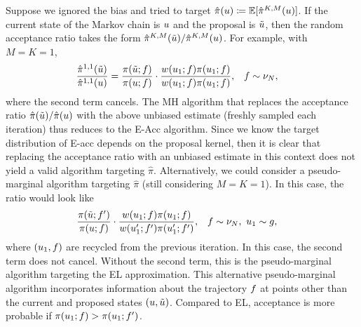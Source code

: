 \documentclass[12pt]{article}
\begin{document}
Suppose we ignored the bias and tried to target $\hat{\pi}(u) \coloneqq \mathbb{E}[\hat{\pi}^{K,M}(u)]$. If the current state of the Markov chain is $u$
and the proposal is $\tilde{u}$, then the random acceptance ratio takes the form $\hat{\pi}^{K,M}(\tilde{u})/\hat{\pi}^{K,M}(u)$. 
For example, with $M = K = 1$,
\begin{align}
&\frac{\hat{\pi}^{1,1}(\tilde{u})}{\hat{\pi}^{1,1}(u)}
= \frac{\pi(\tilde{u}; f)}{\pi(u; f)} \cdot
\frac{w(u_1; f)\pi(u_1; f)}{w(u_1; f)\pi(u_1; f)}, &&f \sim \nu_{N},
\end{align}
where the second term cancels. The MH algorithm that replaces the acceptance ratio $\hat{\pi}(\tilde{u})/\hat{\pi}(u)$ with the 
above unbiased estimate (freshly sampled each iteration) thus reduces to the E-Acc algorithm. Since we know the target distribution 
of E-acc depends on the proposal kernel, then it is clear that replacing the acceptance ratio with an unbiased estimate in this context does
not yield a valid algorithm targeting $\hat{\pi}$. Alternatively, we could consider a pseudo-marginal algorithm targeting $\hat{\pi}$ (still 
considering $M = K = 1$). In this case, the ratio would look like
\begin{align}
&\frac{\pi(\tilde{u}; f^\prime)}{\pi(u; f)} \cdot
\frac{w(u_1; f)\pi(u_1; f)}{w(u_1^\prime; f^\prime)\pi(u_1^\prime; f^\prime)}, 
&&f \sim \nu_{N}, \ u_1 \sim g,
\end{align}
where $(u_1, f)$ are recycled from the previous iteration. In this case, the second term does not cancel. Without the second
term, this is the pseudo-marginal algorithm targeting the EL approximation. This alternative pseudo-marginal algorithm incorporates 
information about the trajectory $f$ at points other than the current and proposed states $(u, \tilde{u})$.
Compared to EL, acceptance is more probable if $\pi(u_1; f) > \pi(u_1; f^\prime)$.
\end{document}
